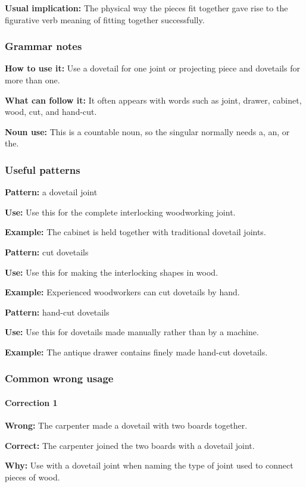 \documentclass[11pt]{article}
\begin{document}
\textbf{Usual implication:} The physical way the pieces fit together gave rise to the figurative verb meaning of fitting together successfully.

\subsubsection{Grammar notes}
\textbf{How to use it:} Use a dovetail for one joint or projecting piece and dovetails for more than one.

\textbf{What can follow it:} It often appears with words such as joint, drawer, cabinet, wood, cut, and hand-cut.

\textbf{Noun use:} This is a countable noun, so the singular normally needs a, an, or the.

\subsubsection{Useful patterns}
\textbf{Pattern:} a dovetail joint

\textbf{Use:} Use this for the complete interlocking woodworking joint.

\textbf{Example:} The cabinet is held together with traditional dovetail joints.

\textbf{Pattern:} cut dovetails

\textbf{Use:} Use this for making the interlocking shapes in wood.

\textbf{Example:} Experienced woodworkers can cut dovetails by hand.

\textbf{Pattern:} hand-cut dovetails

\textbf{Use:} Use this for dovetails made manually rather than by a machine.

\textbf{Example:} The antique drawer contains finely made hand-cut dovetails.

\subsubsection{Common wrong usage}
\paragraph{Correction 1}
\textbf{Wrong:} The carpenter made a dovetail with two boards together.

\textbf{Correct:} The carpenter joined the two boards with a dovetail joint.

\textbf{Why:} Use with a dovetail joint when naming the type of joint used to connect pieces of wood.
\end{document}
